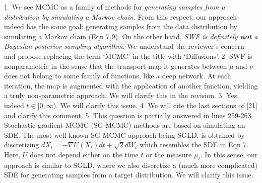 \documentclass{article}
\newcommand{\rev}[1]{{\color{red} #1}}
\newcommand{\alain}[1]{{\color{cyan} #1}}
\newcommand{\ubul}[1]{{\large \color{red} \textcircled{\small #1}}}
\begin{document}
%
\ubul{1} We see MCMC as a family of methods for \emph{generating samples from a distribution by simulating a Markov chain}. From this respect, our approach indeed has the same goal: generating samples from the data distribution by simulating a Markov chain (Eqn 7,9). On the other hand, \emph{SWF is definitely \textbf{not} a Bayesian posterior sampling algorithm}. We understand the reviewer's concern and propose replacing the term `MCMC' in the title with `Diffusions'.
%
%
\ubul{2} SWF is nonparametric in the sense that the transport map it generates between $\mu$ and $\nu$ does not belong to some family of functions, like a deep network. At each iteration, the map is augmented with the application of another function, yielding a truly non-parametric approach. We will clarify this in the revision.
%
%
\ubul{3} Yes, indeed $t \in [0, \infty)$. We will clarify this issue.
%
%
\ubul{4} We will cite the last sections of [21] and clarify this comment.
%
%
%
\ubul{5} This question is partially answered in lines 259-263. Stochastic gradient MCMC (SG-MCMC) methods are based on simulating an SDE. The most well-known SG-MCMC approach being SGLD, is obtained by discretizing $d X_t = - \nabla U(X_t) dt + \sqrt{2} dW_t$ which resembles the SDE in Eqn 7. Here, $U$ does not depend either on the time $t$ or the measure $\mu_t$. In this sense, our approach is similar to SGLD, where we also discretize a (much more complicated) SDE for generating samples from a target distribution. We will clarify this issue. 
\end{document}
